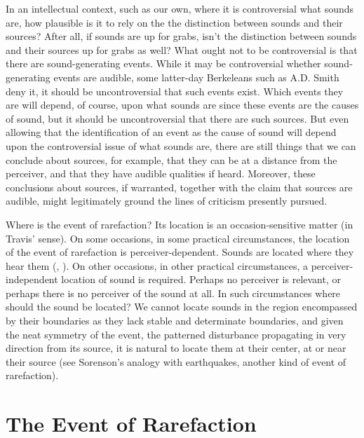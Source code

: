 \documentclass[12pt]{article}
\begin{document}
In an intellectual context, such as our own, where it is controversial what sounds are, how plausible is it to rely on the the distinction between sounds and their sources? After all, if sounds are up for grabs, isn’t the distinction between sounds and their sources up for grabs as well? What ought not to be controversial is that there are sound-generating events. While it may be controversial whether sound-generating events are audible, some latter-day Berkeleans such as A.D. Smith \citeyearpar{Smith:2002sa} deny it, it should be uncontroversial that such events exist. Which events they are will depend, of course, upon what sounds are since these events are the causes of sound, but it should be uncontroversial that there are such sources. But even allowing that the identification of an event as the cause of sound will depend upon the controversial issue of what sounds are, there are still things that we can conclude about sources, for example, that they can be at a distance from the perceiver, and that they have audible qualities if heard. Moreover, these conclusions about sources, if warranted, together with the claim that sources are audible, might legitimately ground the lines of criticism presently pursued. 

Where is the event of rarefaction? Its location is an occasion-sensitive matter (in Travis' \citeyear{Travis:2008la} sense). On some occasions, in some practical circumstances, the location of the event of rarefaction is perceiver-dependent. Sounds are located where they hear them (\citealt{Nudds:2009sf}, \citealt{OShaughnessy:2009aa}). On other occasions, in other practical circumstances, a perceiver-independent location of sound is required. Perhaps no perceiver is relevant, or perhaps there is no perceiver of the sound at all. In such circumstances where should the sound be located? We cannot locate sounds in the region encompassed by their boundaries as they lack stable and determinate boundaries, and given the neat symmetry of the event, the patterned disturbance propagating in very direction from its source, it is natural to locate them at their center, at or near their source (see Sorenson's \citeyear{Sorensen:2009aa} analogy with earthquakes, another kind of event of rarefaction).





\section{The Event of Rarefaction} %
\label{sec:the_event_of_rarefaction}
\end{document}
